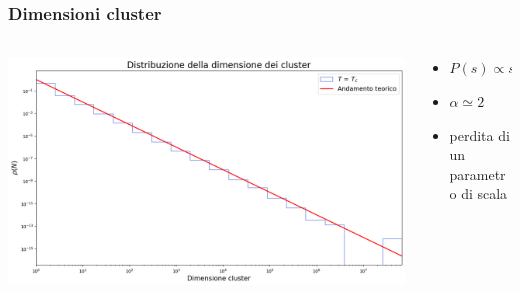\begin{frame}
    \frametitle{Dimensioni cluster}
    \framesubtitle{}

    \begin{columns}
        \begin{column}{0.6\textwidth}

            \centering
            \includegraphics[width=\textwidth]{Immagini/simIsing2D/dimCl_Tc.png}

        \end{column}
    
        \begin{column}{0.4\textwidth}


                \begin{itemize}[itemsep=0.5em, label=$\diamond$]
                    \item $P\left(s\right) \propto s^{-\alpha}$
                    \item $\alpha \simeq 2$
                    \item perdita di un parametro di scala
                \end{itemize}
            
        \end{column}
    \end{columns}

    \centering
    
\end{frame}
